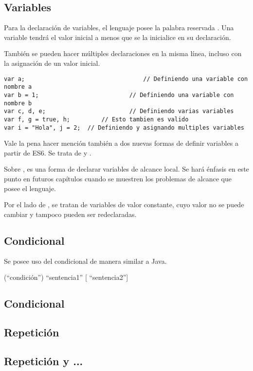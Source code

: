 \subsection{Variables}

Para la declaración de variables, el lenguaje posee la palabra reservada . Una variable tendrá el valor inicial  a menos que se la inicialice en su declaración.

También se pueden hacer múltiples declaraciones en la misma línea, incluso con la asignación de un valor inicial.

\begin{lstlisting}[title={Declarando variables}]
var a;									// Definiendo una variable con nombre a
var b = 1; 	 						// Definiendo una variable con nombre b
var c, d, e;	 					// Definiendo varias variables
var f, g = true, h;			// Esto tambien es valido
var i = "Hola", j = 2;	// Definiendo y asignando multiples variables
\end{lstlisting}

Vale la pena hacer mención también a dos nuevas formas de definir variables a partir de ES6. Se trata de  y .

Sobre , es una forma de declarar variables de alcance local. Se hará énfasis en este punto en futuros capítulos cuando se muestren los problemas de alcance que posee el lenguaje.

Por el lado de , se tratan de variables de valor constante, cuyo valor no se puede cambiar y tampoco pueden ser redeclaradas.

\subsection{Condicional }

Se posee uso del condicional  de manera similar a Java.

 ("`condición"') "`sentencia1"' [ "`sentencia2"']

\subsection{Condicional }

\subsection{Repetición }

\subsection{Repetición  y ...}
